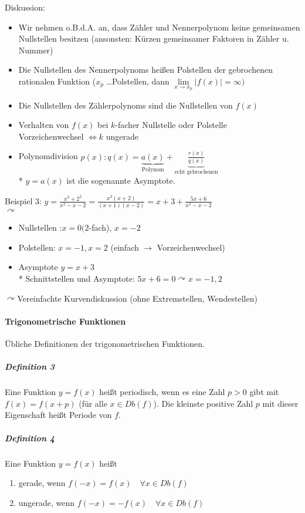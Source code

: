 \documentclass[a4paper]{scrartcl}
\begin{document}
Diskussion:
\begin{itemize}
\item Wir nehmen o.B.d.A. an, dass Zähler und Nennerpolynom keine gemeinsamen Nullstellen besitzen (ansonsten: Kürzen gemeinsamer Faktoren in Zähler u. Nummer)
\item Die Nullstellen des Nennerpolynoms heißen Polstellen der gebrochenen rationalen Funktion ($x_p$ \dots Polstellen, dann $\lim\limits_{x \rightarrow x_p} \lvert f(x) \rvert = \infty)$
\item Die Nullstellen des Zählerpolynoms sind die Nullstellen von $f(x)$
\item Verhalten von $f(x)$ bei $k$-facher Nullstelle oder Polstelle\\
Vorzeichenwechsel $\Leftrightarrow k$ ungerade
\item Polynomdivision $p(x) : q(x) = \underbrace{a(x)}_{\text{Polynom}} + \underbrace{\frac{r(x)}{q(x)}}_{\text{echt gebrochenen}}$\\*
$y=a(x)$ ist die sogenannte Asymptote.
\end{itemize}

Beispiel 3: $y=\frac{x^3+2^2}{x^2-x-2}=\frac{x^2(x+2)}{(x+1)(x-2)}=x+3 + \frac{5x +6}{x^2-x-2}$\\
$\curvearrowright$
\begin{itemize}
\item Nullstellen :$x=0 (2$-fach), $x=-2$
\item Polstellen: $x=-1, x=2$ (einfach $\rightarrow$ Vorzeichenwechsel)
\item Asymptote $y=x+3$\\*
Schnittstellen und Asymptote: $5x+6 = 0 \curvearrowright x=-1,2$
\end{itemize}
$\curvearrowright$Vereinfachte Kurvendiskussion (ohne Extremstellen, Wendestellen)

\paragraph{Trigonometrische Funktionen} Übliche Definitionen der trigonometrischen Funktionen.

\subparagraph{Definition 3}
Eine Funktion $y=f(x)$ heißt periodisch, wenn es eine Zahl $p>0$ gibt mit $f(x)=f(x+p)$ (für alle $x \in Db(f)$). Die kleinste positive Zahl $p$ mit dieser Eigenschaft heißt Periode von $f$.
\subparagraph{Definition 4}
Eine Funktion $y=f(x)$ heißt
\begin{enumerate}
\item gerade, wenn $f(-x)=f(x) \quad \forall x \in Db(f)$ 
\item ungerade, wenn $f(-x)=-f(x) \quad \forall x \in Db(f)$
\end{enumerate}
\end{document}
